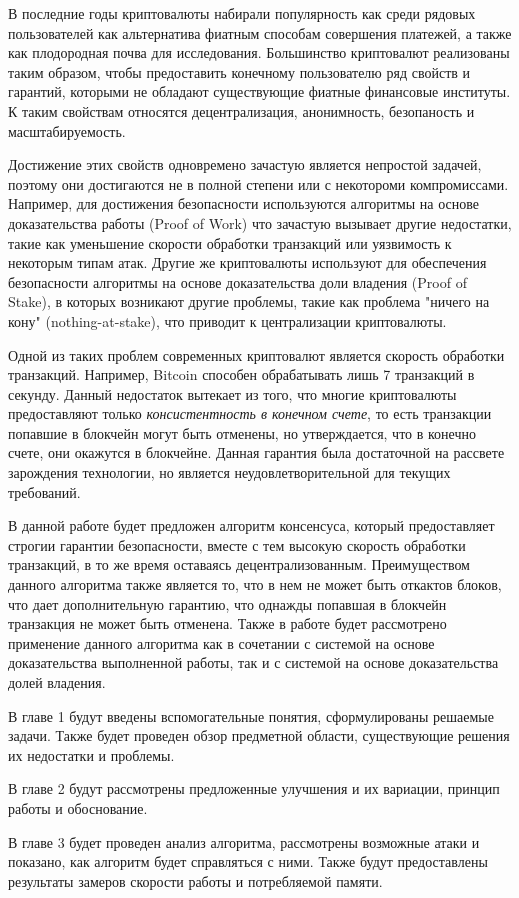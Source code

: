 \startprefacepage
В последние годы криптовалюты набирали популярность как среди рядовых пользователей как альтернатива фиатным способам совершения платежей, а также как плодородная почва для исследования.
Большинство криптовалют реализованы таким образом, чтобы предоставить конечному пользователю ряд свойств и гарантий, которыми не обладают существующие фиатные финансовые институты. К таким свойствам относятся децентрализация, анонимность, безопаность и масштабируемость.
 
Достижение этих свойств одновремено зачастую является непростой задачей, 
поэтому они достигаются не в полной степени или с некотороми компромиссами.
Например, для достижения безопасности используются алгоритмы на основе доказательства работы (Proof of Work)\cite{pow}
что зачастую вызывает другие недостатки, такие как уменьшение скорости обработки транзакций или уязвимость к некоторым типам атак.
Другие же криптовалюты используют для обеспечения безопасности алгоритмы на основе доказательства доли владения (Proof of Stake)\cite{pos}, в которых 
возникают другие проблемы, такие как проблема "ничего на кону" (nothing-at-stake)\cite{pos},
что приводит к централизации криптовалюты.

Одной из таких проблем современных криптовалют является скорость обработки транзакций. 
Например, Bitcoin способен обрабатывать лишь 7 транзакций в секунду. Данный недостаток вытекает из того,
что многие криптовалюты предоставляют только \textit{консистентность в конечном счете}\cite{DBLP:journals/corr/DeckerSW14}, то есть транзакции попавшие в блокчейн могут быть отменены, но утверждается, что в конечно счете, они окажутся в блокчейне. Данная гарантия была достаточной на рассвете зарождения технологии,  но является неудовлетворительной для текущих требований.

В данной работе будет предложен алгоритм консенсуса, который предоставляет строгии гарантии безопасности, 
вместе с тем высокую скорость обработки транзакций, в то же время оставаясь децентрализованным.
Преимуществом данного алгоритма также является то, что в нем не может быть откактов блоков,
что дает дополнительную гарантию, что однажды попавшая в блокчейн транзакция не может быть отменена.
Также в работе будет рассмотрено применение данного алгоритма как в сочетании с системой на основе доказательства выполненной работы,
так и с системой на основе доказательства долей владения.

В главе 1 будут введены вспомогательные понятия, сформулированы решаемые задачи.
Также будет проведен обзор предметной области, существующие решения их недостатки и проблемы.

В главе 2 будут рассмотрены предложенные улучшения и их вариации, принцип работы и обоснование.

В главе 3 будет проведен анализ алгоритма, рассмотрены возможные атаки и показано, как алгоритм будет справляться с ними.
Также будут предоставлены результаты замеров скорости работы и потребляемой памяти.